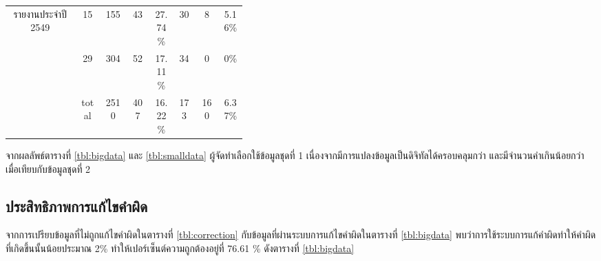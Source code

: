 \begin{table}[H]
\begin{tabular}{|c|c|c|p{0.1\linewidth}|p{0.1\linewidth}|c|p{0.1\linewidth}|p{0.1\linewidth}|}
        \multirow{2}{*}{รายงานประจำปี 2549}   & 15    & 155       & \multicolumn{1}{c|}{43 }         & \multicolumn{1}{c|}{27.74\%} & \multicolumn{1}{c|}{30 }    & \multicolumn{1}{c|}{8   }            & \multicolumn{1}{c|}{5.16\% } \\ \cline{2-8} 
                                            & 29    & 304       & \multicolumn{1}{c|}{52 }         & \multicolumn{1}{c|}{17.11\%} & \multicolumn{1}{c|}{34 }    & \multicolumn{1}{c|}{0   }            & \multicolumn{1}{c|}{0\%    } \\ \hline
                                            & total & 2510      & \multicolumn{1}{c|}{407}         & \multicolumn{1}{c|}{16.22\%} & \multicolumn{1}{c|}{173}    & \multicolumn{1}{c|}{160 }            & \multicolumn{1}{c|}{6.37\% } \\ \hline
        \end{tabular}
        \end{table}


จากผลลัพธ์ตารางที่ \ref{tbl:bigdata} และ \ref{tbl:smalldata} ผู้จัดทำเลือกใช้ข้อมูลชุดที่ 1 เนื่องจากมีการแปลงข้อมูลเป็นดิจิทัลได้ครอบคลุมกว่า และมีจำนวนคำเกินน้อยกว่า เมื่อเทียบกับข้อมูลชุดที่ 2

\subsection{ประสิทธิภาพการแก้ไขคำผิด}
จากการเปรียบข้อมูลที่ไม่ถูกแก้ไขคำผิดในตารางที่ \ref{tbl:correction} กับข้อมูลที่ผ่านระบบการแก้ไขคำผิดในตารางที่ \ref{tbl:bigdata}
พบว่าการใช้ระบบการแก้คำผิดทำให้คำผิดที่เกิดขึ้นนั้นน้อยประมาณ 2\% ทำให้เปอร์เซ็นต์ความถูกต้องอยู่ที่ 76.61 \% ดังตารางที่ \ref{tbl:bigdata}

